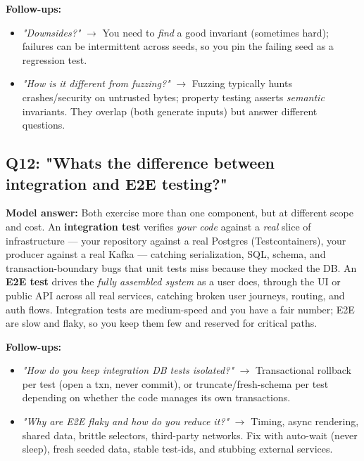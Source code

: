 \documentclass[11pt]{article}
\providecommand{\tightlist}{\setlength{\itemsep}{1pt}\setlength{\parskip}{0pt}}
\begin{document}
\textbf{Follow-ups:}

\begin{itemize}
\tightlist
\item
  \emph{"Downsides?"} \(\rightarrow\) You need to \emph{find} a good invariant (sometimes hard); failures can be intermittent across seeds, so you pin the failing seed as a regression test.
\item
  \emph{"How is it different from fuzzing?"} \(\rightarrow\) Fuzzing typically hunts crashes/security on untrusted bytes; property testing asserts \emph{semantic} invariants. They overlap (both generate inputs) but answer different questions.
\end{itemize}

\subsection{Q12: "What\textquotesingle s the difference between integration and E2E testing?"}\label{q12-whats-the-difference-between-integration-and-e2e-testing}

\textbf{Model answer:} Both exercise more than one component, but at different scope and cost. An \textbf{integration test} verifies \emph{your code} against a \emph{real} slice of infrastructure --- your repository against a real Postgres (Testcontainers), your producer against a real Kafka --- catching serialization, SQL, schema, and transaction-boundary bugs that unit tests miss because they mocked the DB. An \textbf{E2E test} drives the \emph{fully assembled system} as a user does, through the UI or public API across all real services, catching broken user journeys, routing, and auth flows. Integration tests are medium-speed and you have a fair number; E2E are slow and flaky, so you keep them few and reserved for critical paths.

\textbf{Follow-ups:}

\begin{itemize}
\tightlist
\item
  \emph{"How do you keep integration DB tests isolated?"} \(\rightarrow\) Transactional rollback per test (open a txn, never commit), or truncate/fresh-schema per test depending on whether the code manages its own transactions.
\item
  \emph{"Why are E2E flaky and how do you reduce it?"} \(\rightarrow\) Timing, async rendering, shared data, brittle selectors, third-party networks. Fix with auto-wait (never sleep), fresh seeded data, stable test-ids, and stubbing external services.
\end{itemize}
\end{document}
